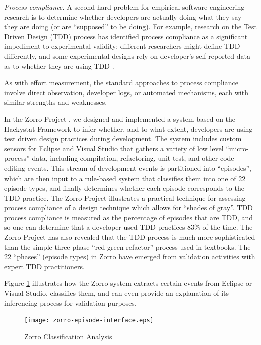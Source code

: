 {\em Process compliance.}  A second hard problem for empirical software
engineering research is to determine whether developers are actually doing
what they say they are doing (or are ``supposed'' to be doing).  For
example, research on the Test Driven Design (TDD) process has identified
process compliance as a significant impediment to experimental validity:
different researchers might define TDD differently, and some experimental
designs rely on developer's self-reported data as to whether they are using
TDD \cite{Janzen:05, Wang:04}.

As with effort measurement, the standard approaches to process compliance
involve direct observation, developer logs, or automated mechanisms, each with 
similar strengths and weaknesses. 

In the Zorro Project \cite{csdl2-06-02}, we designed and implemented a
system based on the Hackystat Framework to infer whether, and to what
extent, developers are using test driven design practices during
development. The system includes custom sensors for Eclipse and Visual
Studio that gathers a variety of low level ``micro-process'' data,
including compilation, refactoring, unit test, and other code editing
events.  This stream of development events is partitioned into
``episodes'', which are then input to a rule-based system that classifies
them into one of 22 episode types, and finally determines whether each
episode corresponds to the TDD practice.  The Zorro Project illustrates a
practical technique for assessing process compliance of a design technique
which allows for ``shades of gray''. TDD process compliance is measured as
the percentage of episodes that are TDD, and so one can determine that a
developer used TDD practices 83\% of the time.  The Zorro Project has also
revealed that the TDD process is much more sophisticated than the simple
three phase ``red-green-refactor'' process used in textbooks.  The 22
``phases'' (episode types) in Zorro have emerged from validation activities
with expert TDD practitioners. 

Figure \ref{fig:Analysis-Table} illustrates how the Zorro system extracts
certain events from Eclipse or Visual Studio, classifies them, and can even
provide an explanation of its inferencing process for validation purposes.

\begin{figure}[th]
  \center
  \texttt{[image: zorro-episode-interface.eps]}
  \caption{Zorro Classification Analysis}
  \label{fig:Analysis-Table}
\end{figure} 

